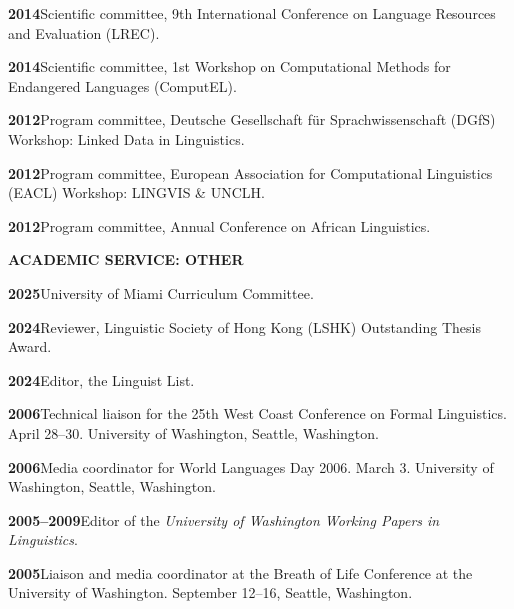 \documentclass[11pt]{article}
\newcommand{\hangpara}{
 \setlength{\parindent}{0in} %
 \hangindent=0.42in %
}
\begin{document}
\vskip 6pt
\hangpara
{\bf 2014}\hspace{1ex}Scientific committee, 9th International Conference on Language Resources and Evaluation (LREC).

\vskip 6pt
\hangpara
{\bf 2014}\hspace{1ex}Scientific committee, 1st Workshop on Computational Methods for Endangered Languages (ComputEL).

\vskip 6pt
\hangpara
{\bf 2012}\hspace{1ex}Program committee, Deutsche Gesellschaft f{\"u}r Sprachwissenschaft (DGfS) Workshop: Linked Data in Linguistics.

\vskip 6pt
\hangpara
{\bf 2012}\hspace{1ex}Program committee, European Association for Computational Linguistics (EACL) Workshop: LINGVIS \& UNCLH.

\vskip 6pt
\hangpara
{\bf 2012}\hspace{1ex}Program committee, Annual Conference on African Linguistics.


\vskip 20pt
\begin{flushleft}
{\bf ACADEMIC SERVICE: OTHER}
\end{flushleft}

\hangpara
{\bf 2025}\hspace{1ex}University of Miami Curriculum Committee.

\vskip 6pt
\hangpara
{\bf 2024}\hspace{1ex}Reviewer, Linguistic Society of Hong Kong (LSHK) Outstanding Thesis Award.

\vskip 6pt
\hangpara
{\bf 2024}\hspace{1ex}Editor, the Linguist List.

\vskip 6pt
\hangpara
{\bf 2006}\hspace{1ex}Technical liaison for the 25th West Coast Conference on Formal Linguistics. April 28--30. University of Washington, Seattle, Washington.

\vskip 6pt
\hangpara
{\bf 2006}\hspace{1ex}Media coordinator for World Languages Day 2006. March 3. University of Washington, Seattle, Washington.

\vskip 6pt
\hangpara
{\bf 2005--2009}\hspace{1ex}Editor of the \textit{University of Washington Working Papers in Linguistics}.

\vskip 6pt
\hangpara
{\bf 2005}\hspace{1ex}Liaison and media coordinator at the Breath of Life Conference at the University of Washington. September 12--16, Seattle, Washington.
\end{document}
